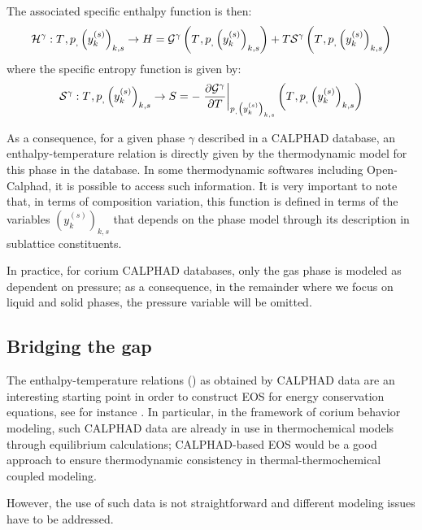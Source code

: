 The associated specific enthalpy function is then:
\begin{equation}
 \Mc{H}^{\gamma}: \temperature{}, \pressure, \left(y_{k}^{(s)}\right)_{k,s} \rightarrow H = \Mc{G}^{\gamma}\left(\temperature{}, \pressure, \left(y_{k}^{(s)}\right)_{k,s}\right) + T \Mc{S}^{\gamma}\left(\temperature{}, \pressure, \left(y_{k}^{(s)}\right)_{k,s}\right)  \label{eq:Hm1}
\end{equation}
where the specific entropy function is given by:
\begin{equation}
\Mc{S}^{\gamma}: \temperature{}, \pressure, \left(y_{k}^{(s)}\right)_{k,s} \rightarrow S = -\left.\frac{\partial \Mc{G}^{\gamma}}{\partial T}\right|_{\pressure, \left(y_{k}^{(s)}\right)_{k,s}} \left(\temperature{}, \pressure, \left(y_{k}^{(s)}\right)_{k,s}\right)
\end{equation}

As a consequence, for a given phase $\gamma$ described in a CALPHAD database, an enthalpy-temperature relation is directly given by the thermodynamic model for this phase in the database. In some thermodynamic softwares including Open-Calphad, it is possible to access such information.
It is very important to note that, in terms of composition variation, this function is defined in terms of the variables $\left(y_{k}^{(s)}\right)_{k,s}$ that depends on the phase model through its description in sublattice constituents.

In practice, for corium CALPHAD databases, only the gas phase is modeled as dependent on pressure; as a consequence, in the remainder where we focus on liquid and solid phases, the pressure variable will be omitted.

\subsection{Bridging the gap} \label{sect:gap}

The enthalpy-temperature relations () as obtained by CALPHAD data are an interesting starting point in order to construct EOS for energy conservation equations, see for instance \cite{Voller2006,Du2007}. In particular, in the framework of corium behavior modeling, such CALPHAD data are already in use in thermochemical models through equilibrium calculations; CALPHAD-based EOS would be a good approach to ensure thermodynamic consistency in thermal-thermochemical coupled modeling.

However, the use of such data is not straightforward and different modeling issues have to be addressed. 

